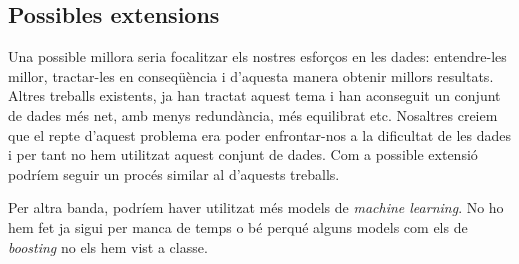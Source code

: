 \documentclass[a4paper]{article} %
\begin{document}
\subsection{Possibles extensions}
Una possible millora seria focalitzar els nostres esforços en les dades: entendre-les millor, tractar-les en conseqüència i d'aquesta manera obtenir millors resultats. Altres treballs existents\cite{kdd_better}, ja han tractat aquest tema i han aconseguit un conjunt de dades més net, amb menys redundància, més equilibrat etc. Nosaltres creiem que el repte d'aquest problema era poder enfrontar-nos a la dificultat de les dades i per tant no hem utilitzat aquest conjunt de dades. Com a possible extensió podríem seguir un procés similar al d'aquests treballs.

Per altra banda, podríem haver utilitzat més models de \textit{machine learning}. No ho hem fet ja sigui per manca de temps o bé perqué alguns models com els de \textit{boosting} no els hem vist a classe.
\nocite{*}
\printbibliography

\end{document}
